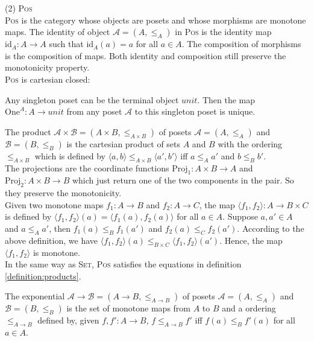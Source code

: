 \begin{myitemize}
\item[(2)] \textsc{Pos}\\
\textsc{Pos} is the category whose objects are posets and whose morphisms are monotone maps. The identity of object $ \mathcal{A} = (A,\leq _A) $ in \textsc{Pos} is the identity map $ \text{id}_A: A \to A $ such that $ \text{id}_A(a) = a $ for all $ a \in A $. The composition of morphisms is the composition of maps. Both identity and composition still preserve the monotonicity property.\\
\textsc{Pos} is cartesian closed:
  \begin{myitemize}
  \item Any singleton poset can be the terminal object $ unit $. Then the map $ \text{One}^A: A \to unit $ from any poset $ \mathcal{A} $ to this singleton poset is unique.
  \item The product $ \mathcal{A} \times \mathcal{B} = (A \times B, \leq_{A \times B}) $ of posets $ \mathcal{A} = (A,\leq _A) $ and $ \mathcal{B} = (B,\leq _B) $ is the cartesian product of sets $ A $ and $ B $ with the ordering $ \leq_{A \times B} $ which is defined by $ \langle a,b \rangle \leq_{A \times B} \langle a',b' \rangle $ iff $ a \leq_A a' $ and $ b \leq_B b' $.\\
  The projections are the coordinate functions $ \text{Proj}_1 : A \times B \to A $ and $ \text{Proj}_2 : A \times B \to B $ which just return one of the two components in the pair. So they preserve the monotonicity.\\
  Given two monotone maps $ f_1: A \to B $ and $ f_2: A \to C $, the map $ \langle f_1, f_2 \rangle : A \to B \times C $ is defined by $ \langle f_1, f_2 \rangle (a) = \langle f_1(a), f_2(a) \rangle $ for all $ a \in A $. Suppose $ a,a' \in A $ and $ a \leq_A a' $, then $ f_1(a) \leq_B f_1(a') $ and $ f_2(a) \leq_C f_2(a') $. According to the above definition, we have $ \langle f_1, f_2 \rangle (a) \leq_{B \times C} \langle f_1, f_2 \rangle (a') $. Hence, the map $ \langle f_1, f_2 \rangle $ is monotone.\\
  In the same way as \textsc{Set}, \textsc{Pos} satisfies the equations in definition \ref{definition:products}.
  \item The exponential $ \mathcal{A} \to \mathcal{B} = (A \to B, \leq_{A \to B}) $ of posets $ \mathcal{A} = (A,\leq _A) $ and $ \mathcal{B} = (B,\leq _B) $ is the set of monotone maps from $ A $ to $ B $ and a ordering $ \leq_{A \to B} $ defined by, given $ f, f' : A \to B $, $ f \leq_{A \to B} f' $ iff $ f(a) \leq_B f'(a) $ for all $ a \in A $.\\

\end{myitemize}
\end{myitemize}
